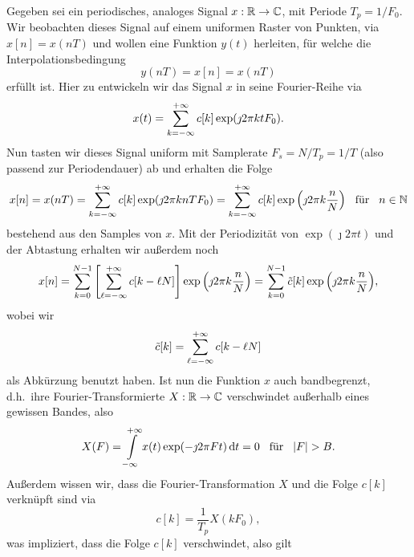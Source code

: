 %
%
Gegeben sei ein periodisches, analoges Signal $x: \mathbb{R} \rightarrow \mathbb{C}$, mit Periode $T_p = 1/F_0$. Wir beobachten dieses Signal auf einem uniformen Raster von Punkten, via $x[n] = x(n T)$ und wollen eine Funktion $y(t)$ herleiten, f\"ur welche die Interpolationsbedingung
\begin{equation}\label{eadf_interpol_cond}
    y(nT) = x[n] = x(nT)
\end{equation}
erf\"ullt ist. Hier zu entwickeln wir das Signal $x$ in seine Fourier-Reihe via
\begin{equation}\label{fourier_series}
    x(t) = {\sum\limits_{k=-\infty}^{+\infty}{
        c[k] \exp(\jmath 2 \pi k t F_0) 
    }}.
\end{equation}
Nun tasten wir dieses Signal uniform mit Samplerate $F_s = N/T_p = 1/T$ (also passend zur Periodendauer) ab und erhalten die Folge 
\begin{equation}
    x[n] = x(n T) = {\sum\limits_{k=-\infty}^{+\infty}{
        c[k] \exp(\jmath 2 \pi k n T F_0) 
    }} = {\sum\limits_{k=-\infty}^{+\infty}{
        c[k] \exp\left(\jmath 2 \pi k \frac nN\right) 
    }}
    {\hspace{3mm} \text{f\"ur} \hspace{3mm}}
    n \in \mathbb{N}
\end{equation}
bestehend aus den Samples von $x$. Mit der Periodizit\"at von $\exp(\jmath 2 \pi t)$ und der Abtastung erhalten wir au{\ss}erdem noch
\begin{equation}
    x[n] = {\sum\limits_{k=0}^{N-1}{
        \left[{\sum\limits_{\ell=-\infty}^{+\infty}{
            c[k - \ell N]
        }}\right] \exp\left(\jmath 2 \pi k \frac nN\right) 
    }} = {\sum\limits_{k=0}^{N-1}{
        \tilde{c}[k] \exp\left(\jmath 2 \pi k \frac nN\right) 
    }},
\end{equation}
wobei wir 
\begin{equation}\label{aliased_ck}
    \tilde{c}[k] = {\sum\limits_{\ell=-\infty}^{+\infty}{
        c[k - \ell N]
    }}
\end{equation}
als Abk\"urzung benutzt haben. Ist nun die Funktion $x$ auch bandbegrenzt, d.h.~ihre Fourier-Transformierte $X : \mathbb{R} \rightarrow \mathbb{C}$ verschwindet au{\ss}erhalb eines gewissen Bandes, also
\begin{equation}
    X(F) = {\int\limits_{-\infty}^{+\infty}{x(t) \exp(-\jmath 2 \pi F t )}\,\mathrm{d}{t}} = 0 {\hspace{3mm} \text{f\"ur} \hspace{3mm}} {\left| F \right|} > B.
\end{equation}
Au{\ss}erdem wissen wir, dass die Fourier-Transformation $X$ und die Folge $c[k]$ verkn\"upft sind via 
\begin{equation}
    c[k] = \frac{1}{T_p} X(k F_0),
\end{equation}
was impliziert, dass die Folge $c[k]$ verschwindet, also gilt
